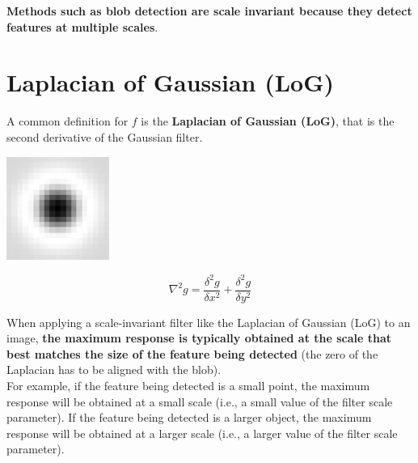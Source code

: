 \documentclass{article}
\begin{document}
\textbf{Methods such as blob detection are scale invariant because they detect features at multiple scales}.

\newpage

\section*{Laplacian of Gaussian (LoG)}

A common definition for $f$ is the \textbf{Laplacian of Gaussian (LoG)}, that is the second derivative of the Gaussian filter.

\begin{center}
    \includegraphics[width=.3\linewidth]{images/laplacian_of_gaussian.jpg}    
\end{center}

\begin{equation*}
    \nabla^2g = \frac{\delta^2g}{\delta x^2} + \frac{\delta^2g}{\delta y^2} 
\end{equation*}

When applying a scale-invariant filter like the Laplacian of Gaussian (LoG) to an image, \textbf{the maximum response is typically obtained at the scale that best matches the size of the feature being detected} (the zero of the Laplacian has to be aligned with the blob). \\

For example, if the feature being detected is a small point, the maximum response will be obtained at a small scale (i.e., a small value of the filter scale parameter). If the feature being detected is a larger object, the maximum response will be obtained at a larger scale (i.e., a larger value of the filter scale parameter). \\
\end{document}
